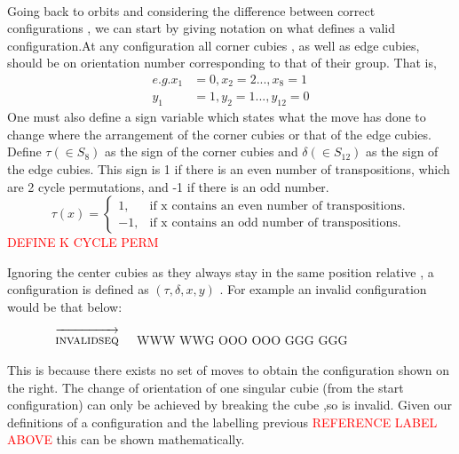 \documentclass{article}
\begin{document}
\paragraph*{}
Going back to orbits and considering the difference between correct configurations , we can start by giving notation on what defines a valid configuration.At any configuration all corner cubies , as well as edge cubies, should be on orientation number corresponding to that of their group. That is,
\begin{align*}
e.g. x_1&=0, x_2=2 ...,x_8=1\\
y_1&=1, y_2=1 ... , y_{12}=0
\end{align*}
One must also define a sign variable which states what the move has done to change where the arrangement of the corner cubies or that of the edge cubies. 
Define $\tau (\in S_{8})$ as the sign of the corner cubies and $\delta (\in  S_{12})$ as the sign of the edge cubies. This sign is 1 if there is an even number of transpositions, which are 2 cycle permutations, and -1 if there is an odd number. 
\begin{equation}
  \tau(x)=\begin{cases}
    1, & \text{if x contains an even number of transpositions}.\\
    -1, & \text{if x contains an odd number of transpositions}.
  \end{cases}
\end{equation}
\textcolor{red}{DEFINE K CYCLE PERM}

Ignoring the center cubies as they always stay in the same position relative , a configuration is defined as \textbf{$(\tau,\delta, x, y)$ }.
For example an invalid configuration would be that below:

\newcommand{\invalidseq}{[invalidseq],F2,F2}%
\newcommand{\invalidseqarrow}{$\quad\overrightarrow{\strut\textsc{invalidseq}}\quad$}

\begin{figure}
\centering
  \RubikCubeSolved%
  \invalidseqarrow
  \RubikRotation{\invalidseq}
   {W}{W}{W} {W}{W}{G}%
   {O}{O}{O} {O}{O}{O}%
   {G}{G}{G} {G}{G}{G}%
\end{figure}
\vspace{20pt}
This is because there exists no set of moves to obtain the configuration shown on the right. The change of orientation of one singular cubie (from the start configuration) can only be achieved by breaking the cube ,so is invalid. Given our definitions of a configuration and the labelling previous \textcolor{red}{REFERENCE LABEL ABOVE} this can be shown mathematically. 
\end{document}
